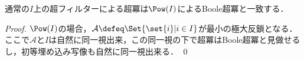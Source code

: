 \documentclass[a4j]{ltjsarticle}
\renewcommand{\emph}[1]{\textbf{\textgt{#1}}}
\begin{document}
\begin{theorem}
 通常の$I$上の超フィルターによる超冪は$\Pow(I)$によるBoole超冪と一致する．
\end{theorem}
\begin{proof}
 $\Pow(I)$の場合，$\mathcal{A} \defeq \Set{\set{i} | i \in I}$が最小の極大反鎖となる．
 ここで$\mathcal{A}$と$I$は自然に同一視出来，この同一視の下で超冪はBoole超冪と見做せるし，初等埋め込み写像も自然に同一視出来る． \qed
\end{proof}
\renewcommand{\emph}[1]{\textsf{\textgt{#1}}}
\nocite{Hamkins:2012qv,Jech:2002,Kunen:2011,Kamo:2007,Shioya:2014fr}
\printbibliography[title=参考文献]
\end{document}
